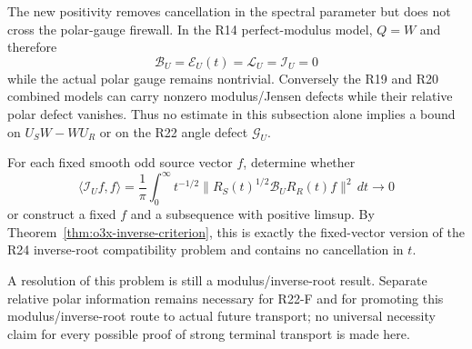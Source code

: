 \begin{remark}
\label{rem:o3x-firewall}
The new positivity removes cancellation in the spectral parameter but does not cross the
polar-gauge firewall.  In the R14 perfect-modulus model,
$Q=W$ and therefore
\[
 \mathscr B_U=\mathscr E_U(t)=\mathscr L_U=\mathscr I_U=0
\]
while the actual polar gauge remains nontrivial.  Conversely the R19 and R20 combined
models can carry nonzero modulus/Jensen defects while their relative polar defect
vanishes.  Thus no estimate in this subsection alone implies a bound on
$U_SW-WU_R$ or on the R22 angle defect $\mathscr G_U$.
\end{remark}

\begin{openproblem}
\label{open:o3x-inverse-measure}
For each fixed smooth odd source vector $f$, determine whether
\[
 \boxed{
 \langle\mathscr I_Uf,f\rangle
 =\frac1\pi\int_0^\infty t^{-1/2}
 \|R_S(t)^{1/2}\mathscr B_UR_R(t)f\|^2\,dt
 \longrightarrow0
 }
\]
or construct a fixed $f$ and a subsequence with positive limsup.  By
Theorem~\ref{thm:o3x-inverse-criterion}, this is exactly the fixed-vector version of the
R24 inverse-root compatibility problem and contains no cancellation in $t$.

A resolution of this problem is still a modulus/inverse-root result.  Separate relative
polar information remains necessary for R22-F and for promoting this
modulus/inverse-root route to actual future transport; no universal necessity claim for
every possible proof of strong terminal transport is made here.
\end{openproblem}
